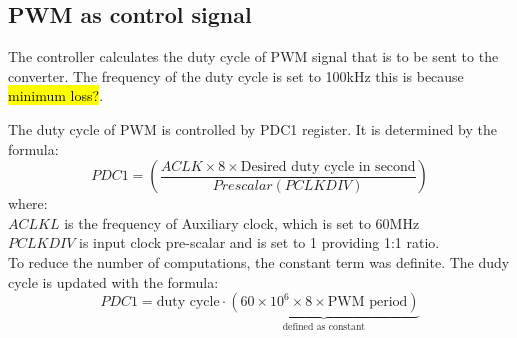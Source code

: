 \subsection{PWM as control signal}
The controller calculates the duty cycle of PWM signal that is to be sent to the converter. The frequency of the duty cycle is set to 100kHz this is because \hl{minimum loss?}. 

The duty cycle of PWM is controlled by PDC1 register. It is determined by the formula\cite{picPWM}:
\[
    PDC1 = \left( \frac{ACLK\times 8\times \text{Desired duty cycle in second}}{Prescalar (PCLKDIV)} \right)
\]
where:\\
$ACLKL$ is the frequency of Auxiliary clock, which is set to 60MHz\\
$PCLKDIV$ is input clock pre-scalar and is set to 1 providing 1:1 ratio. \\

To reduce the number of computations, the constant term was definite. The dudy cycle is  updated with the formula:
\[
    PDC1 = \text{duty cycle}\cdot \underbrace{(60\times10^6\times 8\times \text{PWM period})}_{\text{defined as constant}}
\]

